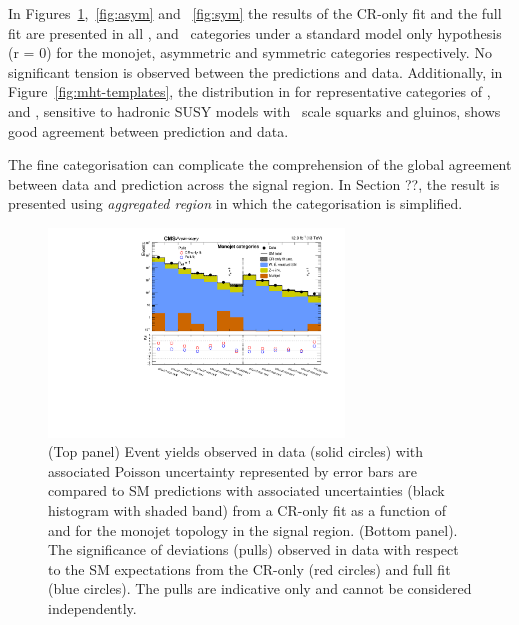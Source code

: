In Figures~\ref{fig:mono},~\ref{fig:asym} and ~\ref{fig:sym} the results of the CR-only fit and the full fit are presented in all \scalht, \njet 
and \nb~categories under a standard model only hypothesis (r = 0) for the monojet, asymmetric 
and symmetric categories respectively. No significant tension is observed between the predictions
and data. Additionally, in Figure~\ref{fig:mht-templates}, the distribution in \mht for representative 
categories of \scalht, \njet and \nb, sensitive to hadronic SUSY models with \TeV ~scale squarks and gluinos, 
shows good agreement between prediction and data.

The fine categorisation can complicate the comprehension of the global agreement between data and 
prediction across the signal region. In Section ??, the result is presented using 
\emph{aggregated region} in which the categorisation is simplified. 

\begin{figure}[!h]
  \begin{center}
    \includegraphics[width=0.7\textwidth]{Figures/statisticalResults/summaryPlot_Monojet_prefit_overlay_fit_b}
    \caption{(Top panel) Event yields observed in data (solid circles) 
	with associated Poisson uncertainty represented by error bars 
	are compared to SM predictions with associated uncertainties (black
      histogram with shaded band) from a CR-only fit as a function of
      \nb and \scalht for the monojet topology in the
      signal region. (Bottom panel). The significance of deviations
      (pulls) observed in data with respect to the SM expectations
      from the CR-only (red circles) and full fit (blue circles). The
      pulls are indicative only and cannot be considered
      independently.}
    \label{fig:mono}
  \end{center}
\end{figure}

